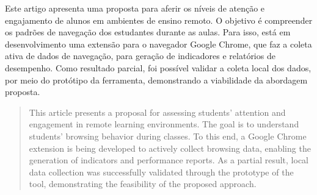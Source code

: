\begin{resumo}
Este artigo apresenta uma proposta para aferir os níveis de atenção e engajamento de alunos em ambientes de ensino remoto. O objetivo é compreender os padrões de navegação dos estudantes durante as aulas.
Para isso, está em desenvolvimento uma extensão para o navegador Google Chrome, que faz a coleta ativa de dados de navegação, para geração de indicadores e relatórios de desempenho.
Como resultado parcial, foi possível validar a coleta local dos dados, por meio do protótipo da ferramenta, demonstrando a viabilidade da abordagem proposta.
\end{resumo}

\begin{abstract}
This article presents a proposal for assessing students' attention and engagement in remote learning environments. The goal is to understand students' browsing behavior during classes. To this end, a Google Chrome extension is being developed to actively collect browsing data, enabling the generation of indicators and performance reports. As a partial result, local data collection was successfully validated through the prototype of the tool, demonstrating the feasibility of the proposed approach.
\end{abstract}
